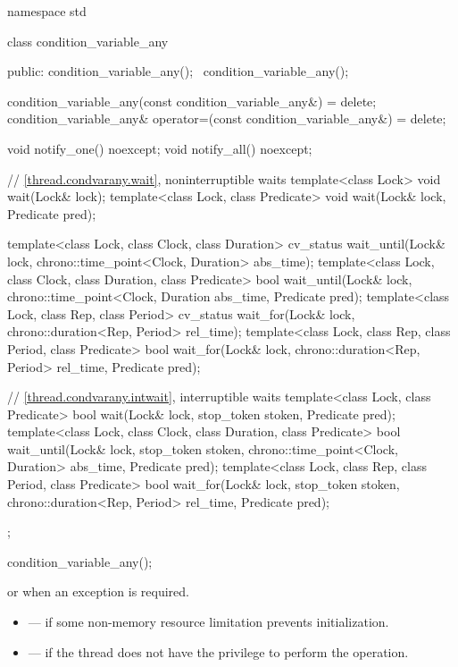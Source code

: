 %
\begin{codeblock}
namespace std {
  class condition_variable_any {
  public:
    condition_variable_any();
    ~condition_variable_any();

    condition_variable_any(const condition_variable_any&) = delete;
    condition_variable_any& operator=(const condition_variable_any&) = delete;

    void notify_one() noexcept;
    void notify_all() noexcept;

    // \ref{thread.condvarany.wait}, noninterruptible waits
    template<class Lock>
      void wait(Lock& lock);
    template<class Lock, class Predicate>
      void wait(Lock& lock, Predicate pred);

    template<class Lock, class Clock, class Duration>
      cv_status wait_until(Lock& lock, chrono::time_point<Clock, Duration> abs_time);
    template<class Lock, class Clock, class Duration, class Predicate>
      bool wait_until(Lock& lock, chrono::time_point<Clock, Duration abs_time,
                      Predicate pred);
    template<class Lock, class Rep, class Period>
      cv_status wait_for(Lock& lock, chrono::duration<Rep, Period> rel_time);
    template<class Lock, class Rep, class Period, class Predicate>
      bool wait_for(Lock& lock, chrono::duration<Rep, Period> rel_time, Predicate pred);

    // \ref{thread.condvarany.intwait}, interruptible waits
    template<class Lock, class Predicate>
      bool wait(Lock& lock, stop_token stoken, Predicate pred);
    template<class Lock, class Clock, class Duration, class Predicate>
      bool wait_until(Lock& lock, stop_token stoken,
                      chrono::time_point<Clock, Duration> abs_time, Predicate pred);
    template<class Lock, class Rep, class Period, class Predicate>
      bool wait_for(Lock& lock, stop_token stoken,
                    chrono::duration<Rep, Period> rel_time, Predicate pred);
  };
}
\end{codeblock}

%
\begin{itemdecl}
condition_variable_any();
\end{itemdecl}

\begin{itemdescr}
\pnum
\throws
{} or  when an exception is
required.

\pnum
\errors
\begin{itemize}
\item {} --- if some non-memory resource
limitation prevents initialization.

\item {} --- if the thread does not have the
privilege to perform the operation.
\end{itemize}
\end{itemdescr}

